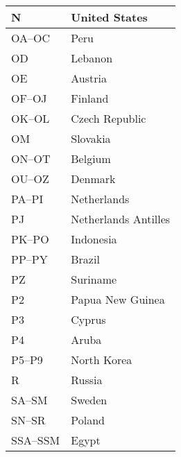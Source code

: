 \begin{longtable}{|l|l|}
  \hline
  N                   & United States                             \\
  \hline
  OA--OC              & Peru                                      \\
  \hline
  OD                  & Lebanon                                   \\
  \hline
  OE                  & Austria                                   \\
  \hline
  OF--OJ              & Finland                                   \\
  \hline
  OK--OL              & Czech Republic                            \\
  \hline
  OM                  & Slovakia                                  \\
  \hline
  ON--OT              & Belgium                                   \\
  \hline
  OU--OZ              & Denmark                                   \\
  \hline
  PA--PI              & Netherlands                               \\
  \hline
  PJ                  & Netherlands Antilles                      \\
  \hline
  PK--PO              & Indonesia                                 \\
  \hline
  PP--PY              & Brazil                                    \\
  \hline
  PZ                  & Suriname                                  \\
  \hline
  P2                  & Papua New Guinea                          \\
  \hline
  P3                  & Cyprus                                    \\
  \hline
  P4                  & Aruba                                     \\
  \hline
  P5--P9              & North Korea                               \\
  \hline
  R                   & Russia                                    \\
  \hline
  SA--SM              & Sweden                                    \\
  \hline
  SN--SR              & Poland                                    \\
  \hline
  SSA--SSM            & Egypt                                     \\
  \hline

\end{longtable}
